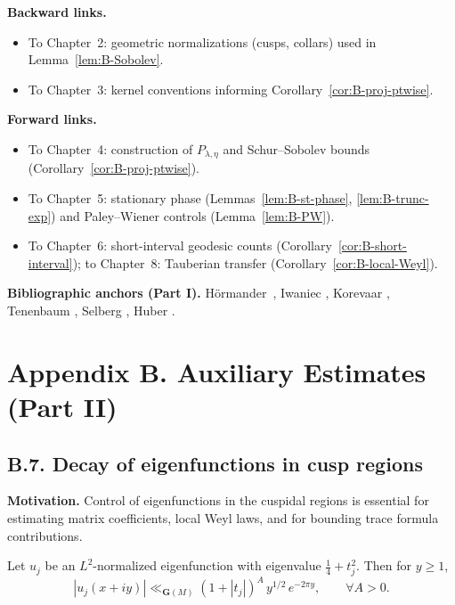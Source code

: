 \noindent\textbf{Backward links.}
\begin{itemize}
  \item To Chapter~2: geometric normalizations (cusps, collars) used in Lemma~\ref{lem:B-Sobolev}.
  \item To Chapter~3: kernel conventions informing Corollary~\ref{cor:B-proj-ptwise}.
\end{itemize}

\noindent\textbf{Forward links.}
\begin{itemize}
  \item To Chapter~4: construction of \(P_{\lambda,\eta}\) and Schur–Sobolev bounds (Corollary~\ref{cor:B-proj-ptwise}).
  \item To Chapter~5: stationary phase (Lemmas~\ref{lem:B-st-phase}, \ref{lem:B-trunc-exp}) and Paley–Wiener controls (Lemma~\ref{lem:B-PW}).
  \item To Chapter~6: short-interval geodesic counts (Corollary~\ref{cor:B-short-interval}); to Chapter~8: Tauberian transfer (Corollary~\ref{cor:B-local-Weyl}).
\end{itemize}

\bigskip
\noindent\textbf{Bibliographic anchors (Part I).}
Hörmander~\cite{Hormander1983}, Iwaniec \cite{Iwaniec2002}, Korevaar \cite{Korevaar2004}, Tenenbaum \cite{Tenenbaum2015}, Selberg \cite{Selberg1956}, Huber \cite{Huber1959}.

\section*{Appendix B. Auxiliary Estimates (Part II)}

\subsection*{B.7. Decay of eigenfunctions in cusp regions}

\noindent
\textbf{Motivation.}
Control of eigenfunctions in the cuspidal regions is essential for estimating matrix coefficients, local Weyl laws, and for bounding trace formula contributions.

\begin{lemma}\label{lem:B-cusp-decay}
Let \(u_j\) be an $L^2$-normalized eigenfunction with eigenvalue $\tfrac14+t_j^2$.  
Then for $y\ge 1$,
\[
|u_j(x+iy)| \ll_{\mathbf{G}(M)} (1+|t_j|)^A\, y^{1/2}\,e^{-2\pi y}, \qquad \forall A>0.
\]
\end{lemma}

